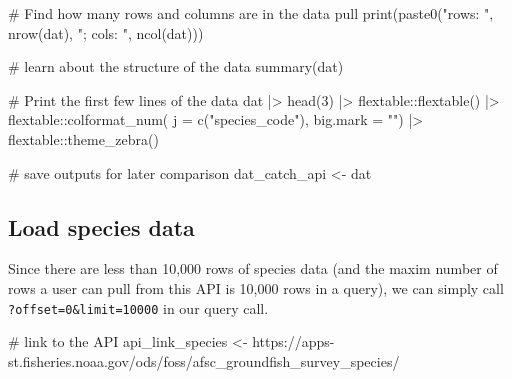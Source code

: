 \documentclass[
  letterpaper,
  oneside,
  open=any]{scrbook}
\newenvironment{Shaded}{\begin{snugshade}}{\end{snugshade}}
\newcommand{\AttributeTok}[1]{\textcolor[rgb]{0.40,0.45,0.13}{#1}}
\newcommand{\CommentTok}[1]{\textcolor[rgb]{0.37,0.37,0.37}{#1}}
\newcommand{\DecValTok}[1]{\textcolor[rgb]{0.68,0.00,0.00}{#1}}
\newcommand{\FunctionTok}[1]{\textcolor[rgb]{0.28,0.35,0.67}{#1}}
\newcommand{\NormalTok}[1]{\textcolor[rgb]{0.00,0.23,0.31}{#1}}
\newcommand{\OtherTok}[1]{\textcolor[rgb]{0.00,0.23,0.31}{#1}}
\newcommand{\SpecialCharTok}[1]{\textcolor[rgb]{0.37,0.37,0.37}{#1}}
\newcommand{\StringTok}[1]{\textcolor[rgb]{0.13,0.47,0.30}{#1}}
\begin{document}
\begin{Shaded}
\begin{Highlighting}[]
\CommentTok{\# Find how many rows and columns are in the data pull}
\FunctionTok{print}\NormalTok{(}\FunctionTok{paste0}\NormalTok{(}\StringTok{"rows: "}\NormalTok{, }\FunctionTok{nrow}\NormalTok{(dat), }\StringTok{"; cols: "}\NormalTok{, }\FunctionTok{ncol}\NormalTok{(dat)))}

\CommentTok{\# learn about the structure of the data}
\FunctionTok{summary}\NormalTok{(dat)}

\CommentTok{\# Print the first few lines of the data }
\NormalTok{dat }\SpecialCharTok{|\textgreater{}} 
  \FunctionTok{head}\NormalTok{(}\DecValTok{3}\NormalTok{) }\SpecialCharTok{|\textgreater{}} 
\NormalTok{  flextable}\SpecialCharTok{::}\FunctionTok{flextable}\NormalTok{() }\SpecialCharTok{|\textgreater{}}
\NormalTok{  flextable}\SpecialCharTok{::}\FunctionTok{colformat\_num}\NormalTok{(}
      \AttributeTok{j =} \FunctionTok{c}\NormalTok{(}\StringTok{"species\_code"}\NormalTok{), }
      \AttributeTok{big.mark =} \StringTok{""}\NormalTok{) }\SpecialCharTok{|\textgreater{}} 
\NormalTok{  flextable}\SpecialCharTok{::}\FunctionTok{theme\_zebra}\NormalTok{()}

\CommentTok{\# save outputs for later comparison}
\NormalTok{dat\_catch\_api }\OtherTok{\textless{}{-}}\NormalTok{ dat}
\end{Highlighting}
\end{Shaded}

\subsection{Load species data}\label{load-species-data}

Since there are less than 10,000 rows of species data (and the maxim
number of rows a user can pull from this API is 10,000 rows in a query),
we can simply call \texttt{?offset=0\&limit=10000} in our query call.

\begin{Shaded}
\begin{Highlighting}[]
\CommentTok{\# link to the API}
\NormalTok{api\_link\_species }\OtherTok{\textless{}{-}} \StringTok{\textquotesingle{}https://apps{-}st.fisheries.noaa.gov/ods/foss/afsc\_groundfish\_survey\_species/\textquotesingle{}}
\end{Highlighting}
\end{Shaded}
\end{document}

